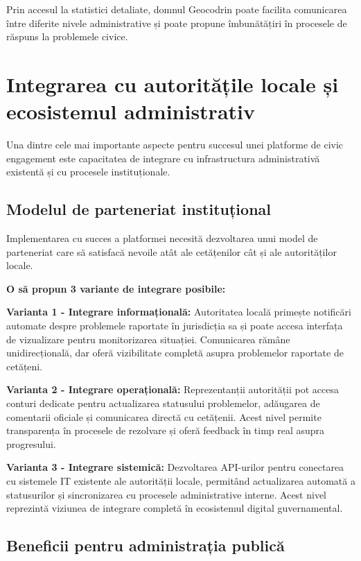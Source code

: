 \documentclass[12pt,a4paper]{report}
\begin{document}
Prin accesul la statistici detaliate, domnul  Geocodrin poate facilita comunicarea între diferite nivele administrative și poate propune îmbunătățiri în procesele de răspuns la problemele civice.

\section{Integrarea cu autoritățile locale și ecosistemul administrativ}

Una dintre cele mai importante aspecte pentru succesul unei platforme de civic engagement este capacitatea de integrare cu infrastructura administrativă existentă și cu procesele instituționale.

\subsection{Modelul de parteneriat instituțional}

Implementarea cu succes a platformei necesită dezvoltarea unui model de parteneriat care să satisfacă nevoile atât ale cetățenilor cât și ale autorităților locale.

\textbf{O să propun 3 variante de integrare posibile:}

\textbf{Varianta 1 - Integrare informațională:} Autoritatea locală primește notificări automate despre problemele raportate în jurisdicția sa și poate accesa interfața de vizualizare pentru monitorizarea situației. Comunicarea rămâne unidirecțională, dar oferă vizibilitate completă asupra problemelor raportate de cetățeni.

\textbf{Varianta 2 - Integrare operațională:} Reprezentanții autorității pot accesa conturi dedicate pentru actualizarea statusului problemelor, adăugarea de comentarii oficiale și comunicarea directă cu cetățenii. Acest nivel permite transparența în procesele de rezolvare și oferă feedback în timp real asupra progresului.

\textbf{Varianta 3 - Integrare sistemică:} Dezvoltarea API-urilor pentru conectarea cu sistemele IT existente ale autorității locale, permitând actualizarea automată a statusurilor și sincronizarea cu procesele administrative interne. Acest nivel reprezintă viziunea de integrare completă în ecosistemul digital guvernamental.

\subsection{Beneficii pentru administrația publică}
\end{document}
